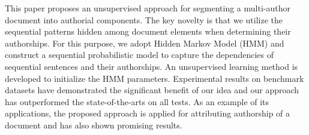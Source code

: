 This paper proposes an unsupervised approach for segmenting a multi-author document into authorial components. The key novelty is that we utilize the sequential patterns hidden among document elements when determining their authorships. For this purpose, we adopt Hidden Markov Model (HMM) and construct a  sequential probabilistic model to capture the dependencies of sequential sentences and their authorships. An unsupervised learning method is developed to initialize the HMM parameters. Experimental results on benchmark datasets have demonstrated the significant benefit of our idea and our approach has outperformed the state-of-the-arts on all tests. As an example of its applications, the proposed approach is applied for attributing authorship of a document and has also shown promising results.
